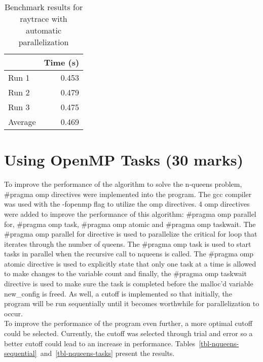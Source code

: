 \documentclass[12pt]{article}
\begin{document}
\begin{table}[H]
  \centering
  \begin{tabular}{lr}
    & {\bf Time (s)} \\
    \hline
    Run 1 & 0.453 \\
    Run 2 & 0.479 \\
    Run 3 & 0.475 \\
    \hline
    Average & 0.469 \\
  \end{tabular}
  \caption{Benchmark results for raytrace with automatic parallelization}
  \label{tbl-raytrace-automatic}
\end{table}


\section*{Using OpenMP Tasks (30 marks)}

To improve the performance of the algorithm to solve the n-queens problem, \#pragma omp directives were implemented into the program. The gcc compiler was used with the -fopenmp flag to utilize the omp directives. 4 omp directives were added to improve the performance of this algorithm: \#pragma omp parallel for, \#pragma omp task, \#pragma omp atomic and \#pragma omp taskwait. The \#pragma omp parallel for directive is used to parallelize the critical for loop that iterates through the number of queens. The \#pragma omp task is used to start tasks in parallel when the recursive call to nqueens is called. The \#pragma omp atomic directive is used to explicitly state that only one task at a time is allowed to make changes to the variable count and finally, the \#pragma omp taskwait directive is used to make sure the task is completed before the malloc'd variable new\_config is freed. As well, a cutoff is implemented so that initially, the program will be run sequentially until it becomes worthwhile for parallelization to occur.
\\
To improve the performance of the program even further, a more optimal cutoff could be selected. Currently, the cutoff was selected through trial and error so a better cutoff could lead to an increase in performance. Tables~\ref{tbl-nqueens-sequential}~and~\ref{tbl-nqueens-tasks} present the results. 
\end{document}

